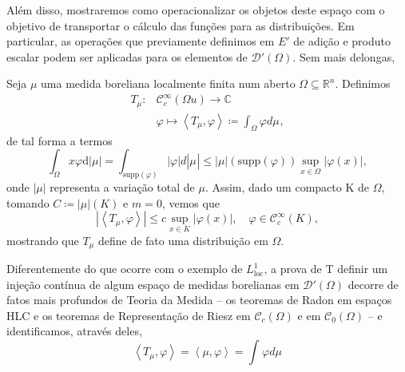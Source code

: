 \documentclass[../distribution_theory_notes.tex]{subfiles}
\begin{document}
Além disso, mostraremos como operacionalizar os objetos deste espaço com o objetivo de transportar o cálculo das funções para as distribuições. Em particular, as operações que previamente definimos em \(E'\) de adição e produto escalar podem ser aplicadas para os elementos de \(\mathcal{D}'(\Omega )\). Sem mais delongas,
\begin{example}
	Seja \(\mu \) uma medida boreliana localmente finita num aberto \(\Omega \subseteq \mathbb{R}^{n}.\) Definimos
	\begin{align*}
		T_{\mu }: & \mathcal{C}_{c}^{\infty}(\Omega u)\rightarrow \mathbb{C}                                        \\
		          & \varphi \longmapsto \left< T_{\mu }, \varphi  \right> \coloneqq \int_{\Omega }\varphi  d\mu_{},
	\end{align*}
	de tal forma a termos
	\[
		\int_{\Omega }^{}x \varphi  \mathrm{d}| \mu  | = \int_{\mathrm{supp}(\varphi )}| \varphi  | d| \mu_{} | \leq | \mu   |(\mathrm{supp}(\varphi ))\sup_{x\in \Omega }| \varphi (x) |,
	\]
	onde \(| \mu  |\) representa a variação total de \(\mu .\) Assim, dado um compacto K de \(\Omega \), tomando \(C\coloneqq | \mu  |(K)\) e \(m=0\), vemos que
	\[
		|\left< T_{\mu }, \varphi  \right>  | \leq c\sup_{x\in K}| \varphi (x) |,\quad \varphi \in \mathcal{C}_{c}^{\infty}(K),
	\]
	mostrando que \(T_{\mu }\) define de fato uma distribuição em \(\Omega.\)
\end{example}
\begin{tcolorbox}[
		skin=enhanced,
		title=Observação,
		fonttitle=\bfseries,
		colframe=black,
		colbacktitle=cyan!75!white,
		colback=cyan!15,
		colbacklower=black,
		coltitle=black,
		drop fuzzy shadow,
	]
	Diferentemente do que ocorre com o exemplo de \(L_{\mathrm{loc}}^{1}\), a prova de T definir um injeção contínua de algum espaço de medidas borelianas em \(\mathcal{D}'(\Omega )\) decorre de fatos mais profundos de Teoria da Medida -- os teoremas de Radon em espaços HLC e os teoremas de Representação de Riesz em \(\mathcal{C}_{c}^{}(\Omega )\) e em \(\mathcal{C}_{0}(\Omega )\) -- e identificamos, através deles,
	\[
		\left< T_{\mu }, \varphi  \right> = \left< \mu , \varphi  \right> = \int_{}\varphi  d\mu_{}
	\]
\end{tcolorbox}
\end{document}
